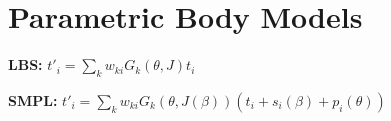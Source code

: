 \section{Parametric Body Models}

\textbf{LBS:} $t'_i = \sum_k w_{ki} G_k(\theta, J) t_i$\\

\textbf{SMPL:} $t'_i = \sum_k w_{ki} G_k(\theta, J(\beta)) (t_i + s_i(\beta) + p_i(\theta))$\\

